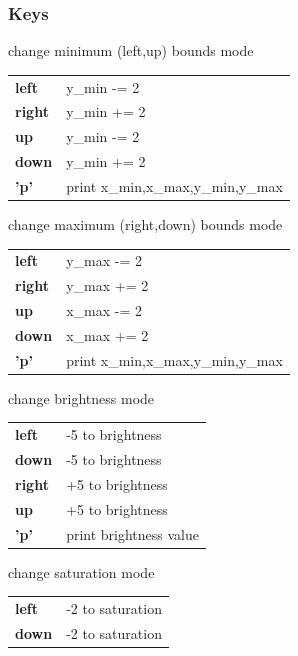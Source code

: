 \subsubsection{Keys}
    \begin{description} \itemindent=-15pt
        \item['l'] change minimum (left,up) bounds mode \\
            \begin{tabular}{ll}
                {\bf left } & y\_min -= 2 \\
                {\bf right} & y\_min += 2 \\
                {\bf up   } & y\_min -= 2 \\
                {\bf down } & y\_min += 2 \\
                {\bf 'p'  } & print x\_min,x\_max,y\_min,y\_max
            \end{tabular}
        \item['u'] change maximum (right,down) bounds mode \\
            \begin{tabular}{ll}
                {\bf left } & y\_max -= 2 \\
                {\bf right} & y\_max += 2 \\
                {\bf up   } & x\_max -= 2 \\
                {\bf down } & x\_max += 2 \\
                {\bf 'p'  } & print x\_min,x\_max,y\_min,y\_max 
            \end{tabular}
        \item['b']  change brightness mode \\
            \begin{tabular}{ll} 
                {\bf left } & -5 to brightness \\
                {\bf down } & -5 to brightness \\
                {\bf right} & +5 to brightness \\
                {\bf up   } & +5 to brightness \\
                {\bf 'p'  } & print brightness value 
            \end{tabular}
        \item['s'] change saturation mode \\
            \begin{tabular}{ll}
                {\bf left } & -2 to saturation \\
                {\bf down } & -2 to saturation \\

\end{tabular}
\end{description}
